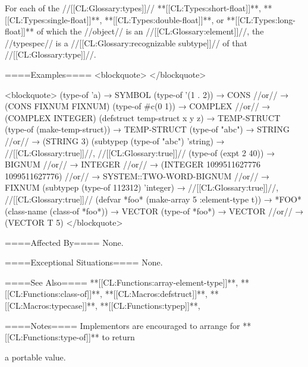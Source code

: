  For each of the //[[CL:Glossary:types]]// **[[CL:Types:short-float]]**, **[[CL:Types:single-float]]**, **[[CL:Types:double-float]]**, or **[[CL:Types:long-float]]** of which the //object// is an //[[CL:Glossary:element]]//, the //typespec// is a //[[CL:Glossary:recognizable subtype]]// of that //[[CL:Glossary:type]]//.

\endlist



====Examples====
<blockquote> </blockquote>

<blockquote> (type-of 'a) → SYMBOL (type-of '(1 . 2)) → CONS //or// → (CONS FIXNUM FIXNUM) (type-of #c(0 1)) → COMPLEX //or// → (COMPLEX INTEGER) (defstruct temp-struct x y z) → TEMP-STRUCT (type-of (make-temp-struct)) → TEMP-STRUCT (type-of "abc") → STRING //or// → (STRING 3) (subtypep (type-of "abc") 'string) → //[[CL:Glossary:true]]//, //[[CL:Glossary:true]]// (type-of (expt 2 40)) → BIGNUM //or// → INTEGER //or// → (INTEGER 1099511627776 1099511627776) //or// → SYSTEM::TWO-WORD-BIGNUM //or// → FIXNUM (subtypep (type-of 112312) 'integer) → //[[CL:Glossary:true]]//, //[[CL:Glossary:true]]// (defvar *foo* (make-array 5 :element-type t)) → *FOO* (class-name (class-of *foo*)) → VECTOR (type-of *foo*) → VECTOR //or// → (VECTOR T 5) </blockquote>

====Affected By====
None.

====Exceptional Situations====
None.

====See Also====
**[[CL:Functions:array-element-type]]**, **[[CL:Functions:class-of]]**, **[[CL:Macros:defstruct]]**, **[[CL:Macros:typecase]]**, **[[CL:Functions:typep]]**, {\secref\Types}

====Notes====
Implementors are encouraged to arrange for **[[CL:Functions:type-of]]** to return

a portable value.



    
